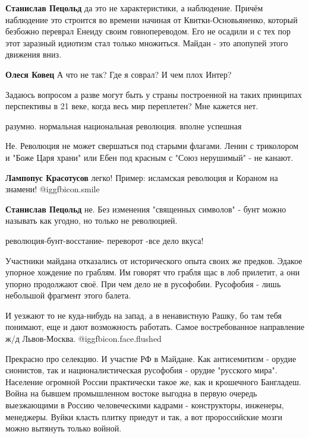 \begin{itemize}
\begin{itemize}
\textbf{Станислав Пецольд} да это не характеристики, а наблюдение. Причём наблюдение это строится во времени начиная от Квитки-Основьяненко, который безбожно переврал Енеиду своим говнопереводом. Его не осадили и с тех пор этот заразный идиотизм стал только множиться. Майдан - это апопупей этого движения вниз.

\textbf{Олеся Ковец} А что не так? Где я соврал? И чем плох Интер?
\end{itemize} %

Задаюсь вопросом а разве могут быть у страны построенной на таких принципах перспективы в 21 веке, когда весь мир переплетен?
Мне кажется нет.

разумно. нормальная национальная революция. вполне успешная

\begin{itemize} %

Не. Революция не может свершаться под старыми флагами. Ленин с триколором и
"Боже Царя храни" или Ебен под красным с "Союз нерушимый" - не канают.

\textbf{Лампопус Красотусов} легко! Пример: исламская революция и Кораном на знамени!  @igg{fbicon.smile} 

\textbf{Станислав Пецольд} не. Без изменения "священных символов" - бунт можно называть как угодно, но только не революцией.

революция-бунт-восстание- переворот -все дело вкуса!
\end{itemize} %


Участники майдана отказались от исторического опыта своих же предков. Эдакое
упорное хождение по граблям. Им говорят что грабля щас в лоб прилетит, а они
упорно продолжают своё. При чем дело не в русофобии. Русофобия - лишь небольшой
фрагмент этого балета.


И уезжают то не куда-нибудь на запад, а в ненавистную Рашку, бо там тебя
понимают, еще и дают возможность работать. Самое востребованное направление ж/д
Львов-Москва. @igg{fbicon.face.flushed} 


Прекрасно про селекцию. И участие РФ в Майдане. Как антисемитизм - орудие
сионистов, так и националистическая русофобия - орудие "русского мира".
Население огромной России практически такое же, как и крошечного Бангладеш.
Война на бывшем промышленном востоке выгодна в первую очередь выезжающими в
Россию человеческими кадрами - конструкторы, инженеры, менеджеры. Вуйки класть
плитку приедут и так, а вот пророссийские мозги можно вытянуть только войной.


\end{itemize}
